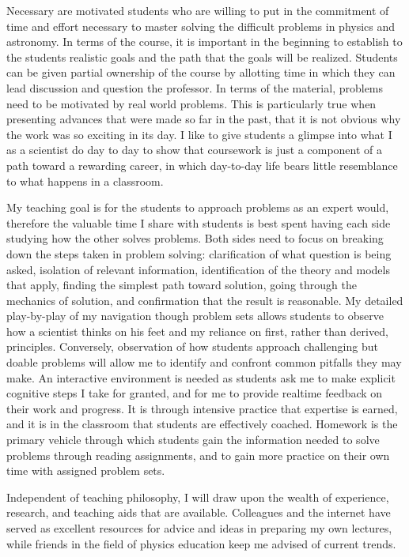 \documentclass{article}
\begin{document}
Necessary are  motivated students who are willing to put in the commitment of time and effort
necessary to master solving the difficult problems in physics and astronomy.
In terms of the course,
it is important in the beginning to establish  to the students realistic goals and the path that the goals will be realized.
Students can be given partial ownership of the course by allotting time in which they can lead discussion and question the
professor.
In terms of the material, problems need to be motivated by real world problems.
This is particularly true when presenting advances that were made so far in the past, that it is not obvious
why the work was so exciting in its day. 
I like to give students a glimpse into what I as a scientist do day to day to show that coursework
is just a component of a path toward a rewarding career, in which day-to-day life bears little resemblance to what
happens in a classroom.

My teaching goal is for the students to approach problems as an expert would, therefore
the valuable time I share with students is best spent having each side studying how the other
solves problems.  Both sides need to focus on breaking down the steps taken in problem solving: 
clarification of what question is  being asked,
isolation of relevant information, 
identification of the theory and models that apply, finding the simplest path toward solution,
going through the mechanics of solution, and confirmation that the result is reasonable.
My detailed play-by-play of my navigation though problem sets  allows students to observe how a scientist thinks on his
feet and my reliance on first, rather than derived, principles.  Conversely, observation of how students
approach challenging but doable problems will allow me to identify and confront common pitfalls they may make.
An interactive environment is needed as students ask me to make explicit cognitive steps I take for granted,
and for me to provide realtime feedback on their work and progress.
It is through intensive practice that expertise is earned, and it is in the classroom that students are effectively coached.
Homework is the primary vehicle through which students gain the information needed to solve problems
through reading assignments, and to gain more practice on their own time with assigned problem sets.

Independent of teaching philosophy, I will draw upon the wealth of experience, research, and teaching aids that are
available.
Colleagues and the internet have served as excellent resources for advice and ideas in preparing
my own lectures, while friends in the field of physics education keep me advised of current trends. 
 \iftoggle{UW}{The University of Washington Institute for Science & Mathematics Education}{I will avail
 myself to the resources for faculty at The Center
 for Research on Learning and Teaching.}
\end{document}
